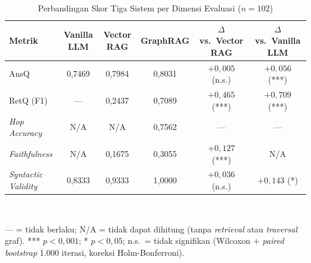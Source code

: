 \begin{table}[t]
\caption{Perbandingan Skor Tiga Sistem per Dimensi Evaluasi ($n=102$)}
\label{tbl:perbandingan}
\centering
\begin{tabular}{|l|c|c|c|c|c|}
\hline
\textbf{Metrik} & \textbf{Vanilla LLM} & \textbf{Vector RAG} & \textbf{GraphRAG} & \textbf{$\Delta$ vs.\ Vector RAG} & \textbf{$\Delta$ vs.\ Vanilla LLM} \\
\hline
AnsQ & 0,7469 & 0,7984 & 0,8031 & $+0{,}005$ (n.s.) & $+0{,}056$ (***) \\
\hline
RetQ (F1) & --- & 0,2437 & 0,7089 & $+0{,}465$ (***) & $+0{,}709$ (***) \\
\hline
\textit{Hop Accuracy} & N/A & N/A & 0,7562 & --- & --- \\
\hline
\textit{Faithfulness} & N/A & 0,1675 & 0,3055 & $+0{,}127$ (***) & N/A \\
\hline
\textit{Syntactic Validity} & 0,8333 & 0,9333 & 1,0000 & $+0{,}036$ (n.s.) & $+0{,}143$ (*) \\
\hline
\end{tabular}
\\[4pt]
{\footnotesize \raggedright --- = tidak berlaku; N/A = tidak dapat dihitung (tanpa \textit{retrieval} atau \textit{traversal} graf). *** $p<0{,}001$; * $p<0{,}05$; n.s.\ = tidak signifikan (Wilcoxon + \textit{paired bootstrap} 1.000 iterasi, koreksi Holm-Bonferroni).\par}
\end{table}
